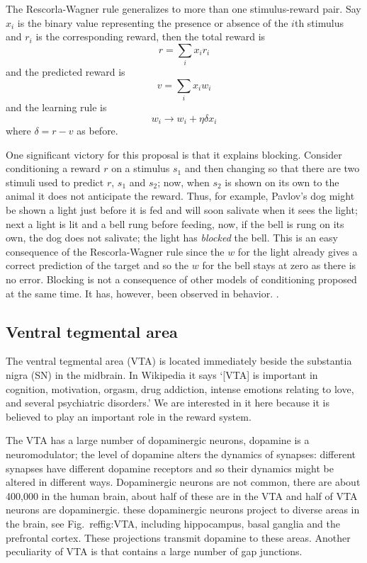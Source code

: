 \documentclass[11pt,a4paper]{scrartcl}
\begin{document}
The Rescorla-Wagner rule generalizes to more than one stimulus-reward pair. Say $x_i$ is the binary value representing the presence or absence of the $i$th stimulus and $r_i$ is the corresponding reward, then the total reward is
\begin{equation}
r=\sum_i x_ir_i
\end{equation}
and the predicted reward is
\begin{equation}
v=\sum_i x_iw_i
\end{equation}
and the learning rule is
\begin{equation}
w_i\rightarrow w_i+\eta\delta x_i
\end{equation}
where $\delta=r-v$ as before. 

One significant victory for this proposal is that it explains
blocking. Consider conditioning a reward $r$ on a stimulus $s_1$ and
then changing so that there are two stimuli used to predict $r$, $s_1$
and $s_2$; now, when $s_2$ is shown on its own to the animal it does
not anticipate the reward. Thus, for example, Pavlov's dog might be
shown a light just before it is fed and will soon salivate when it
sees the light; next a light is lit and a bell rung before feeding,
now, if the bell is rung on its own, the dog does not salivate; the
light has \textsl{blocked} the bell. This is an easy consequence of
the Rescorla-Wagner rule since the $w$ for the light already gives a
correct prediction of the target and so the $w$ for the bell stays at
zero as there is no error. Blocking is not a consequence of other
models of conditioning proposed at the same time. It has, however,
been observed in behavior.
\cite{MillerEtAl1995a,AzorlosaCicala1986a}.

\subsection*{Ventral tegmental area}

The ventral tegmental area (VTA) is located immediately beside the
substantia nigra (SN) in the midbrain. In Wikipedia it says \lq{}[VTA] is
important in cognition, motivation, orgasm, drug addiction, intense
emotions relating to love, and several psychiatric disorders.\rq{} We
are interested in it here because it is believed to play an important
role in the reward system. 

The VTA has a large number of dopaminergic neurons, dopamine is a
neuromodulator; the level of dopamine alters the dynamics of synapses:
different synapses have different dopamine receptors and so their
dynamics might be altered in different ways. Dopaminergic neurons are
not common, there are about 400,000 in the human brain, about half of
these are in the VTA and half of VTA neurons are dopaminergic. these
dopaminergic neurons project to diverse areas in the brain, see
Fig.~ref{fig:VTA}, including hippocampus, basal ganglia and the
prefrontal cortex. These projections transmit dopamine to these
areas. Another peculiarity of VTA is that contains a large number of
gap junctions.
\end{document}
